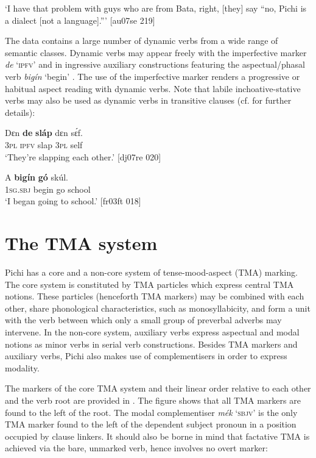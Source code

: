 \glt ‘I have that problem with guys who are from Bata, right, [they] say 
“no, Pichi is a dialect [not a language].”’ [au07se 219]
\z

The data contains a large number of dynamic verbs from a wide range of semantic classes. Dynamic verbs may appear freely with the imperfective marker \textit{de} ‘\textsc{ipfv’}  and in ingressive auxiliary constructions featuring the aspectual/phasal verb \textit{bigín} ‘begin’ . The use of the imperfective marker renders a progressive or habitual aspect reading with dynamic verbs. Note that labile inchoative-stative verbs may also be used as dynamic verbs in transitive clauses (cf.  for further details):


\ea%
    \label{ex:key:312}
    \gll Dɛn  \textbf{de}  \textbf{sláp}  dɛn  sɛ́f.\\
\textsc{3pl}  \textsc{ipfv}  slap  \textsc{3pl}  self\\

\glt ‘They’re slapping each other.’ [dj07re 020]
\z


\ea%
    \label{ex:key:313}
    \gll \MakeUppercase{A}   \textbf{bigín}  \textbf{gó}  skúl.\\
\textsc{1sg.sbj}  begin  go  school\\

\glt ‘I began going to school.’ [fr03ft 018]
\z

\section{The TMA system}\label{sec:6.2}

Pichi has a core and a non-core system of tense-mood-aspect (TMA) marking. The core system is constituted by TMA particles which express central TMA notions. These particles (henceforth TMA markers) may be combined with each other, share phonological characteristics, such as monosyllabicity, and form a unit with the verb between which only a small group of preverbal adverbs may intervene. In the non-core system, auxiliary verbs express aspectual and modal notions as minor verbs in serial verb constructions. Besides TMA markers and auxiliary verbs, Pichi also makes use of complementisers in order to express modality. 


The markers of the core TMA system and their linear order relative to each other and the verb root are provided in . The figure shows that all TMA markers are found to the left of the root. The modal complementiser \textit{mék} ‘\textsc{sbjv}’ is the only TMA marker found to the left of the dependent subject pronoun in a position occupied by clause linkers. It should also be borne in mind that factative TMA is achieved via the bare, unmarked verb, hence involves no overt marker: 


